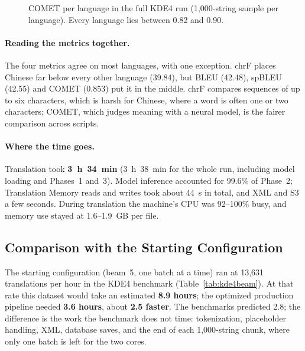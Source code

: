 \begin{figure}[H]
\centering
{}
\caption[COMET per language in the full KDE4 run]{COMET per language in the full KDE4 run (1,000-string sample per
language). Every language lies between 0.82 and 0.90.}
\label{fig:kde4chrf}
\end{figure}

\paragraph{Reading the metrics together.} The four metrics agree on most languages, with one exception. chrF places
Chinese far below every other language (39.84), but BLEU (42.48), spBLEU (42.55) and COMET (0.853) put it in the middle.
chrF compares sequences of up to six characters, which is harsh for Chinese, where a word is often one or two
characters; COMET, which judges meaning with a neural model, is the fairer comparison across scripts.

\paragraph{Where the time goes.} Translation took \textbf{3~h~34~min} (3~h~38~min for the whole run, including model
loading and Phases~1 and~3). Model inference accounted for 99.6\% of Phase~2; Translation Memory reads and writes took
about 44~s in total, and XML and S3 a few seconds. During translation the machine's CPU was 92--100\% busy, and memory use
stayed at 1.6--1.9~GB per file.

\subsection{Comparison with the Starting Configuration}
The starting configuration (beam~5, one batch at a time) ran at 13,631 translations per hour in the KDE4 benchmark
(Table~\ref{tab:kde4beam}). At that rate this dataset would take an estimated \textbf{8.9 hours}; the optimized
production pipeline needed \textbf{3.6 hours}, about \textbf{2.5\x{} faster}. The benchmarks predicted 2.8\x{}; the
difference is the work the benchmark does not time: tokenization, placeholder handling, XML, database saves, and the end
of each 1,000-string chunk, where only one batch is left for the two cores.

